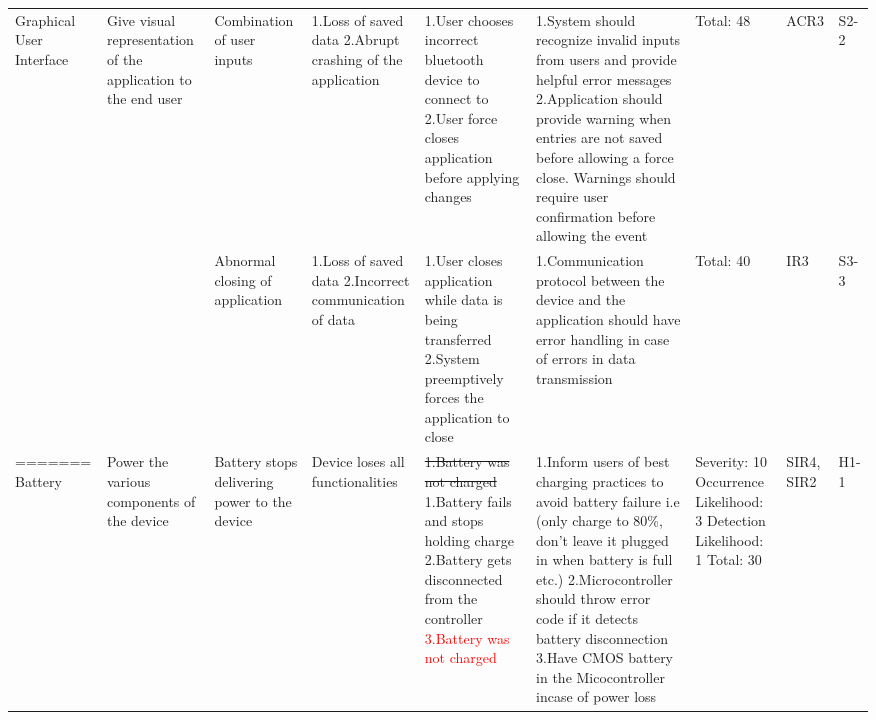 \documentclass[12pt, titlepage]{article}
\begin{document}
\begin{landscape}
\begin{table}[H]
\begin{tabular}{| p{} | p{}  | p{} | p{} | p{} | p{} | p{} | p{} | p{} |}
    Graphical User Interface & Give visual representation of the application to the end user & Combination of user inputs & 1.Loss of saved data \newline 2.Abrupt crashing of the application  &  1.User chooses incorrect bluetooth device to connect to \newline 2.User force closes application before applying changes  &  1.System should recognize invalid inputs from users and provide helpful error messages \newline 2.Application should provide warning when entries are not saved before allowing a force close. Warnings should require user confirmation before allowing the event  & Total: 48 & ACR3 & S2-2 \\ \cline{3-9}

     & & Abnormal closing of application & 1.Loss of saved data \newline 2.Incorrect communication of data  & 1.User closes application while data is being transferred \newline 2.System preemptively forces the application to close & 1.Communication protocol between the device and the application should have error handling in case of errors in data transmission  & Total: 40 & IR3 & S3-3 \\ \hline
=======
    Battery & Power the various components of the device  & Battery stops delivering power to the device & Device loses all functionalities & \sout{1.Battery was not charged} \newline 1.Battery fails and stops holding charge \newline 2.Battery gets disconnected from the controller \newline \textcolor{red}{3.Battery was not charged} & 1.Inform users of best charging practices to avoid battery failure i.e (only charge to 80\%, don't leave it plugged in when battery is full etc.) \newline 2.Microcontroller should throw error code if it detects battery disconnection \newline 3.Have CMOS battery in the Micocontroller incase of power loss & Severity: 10 \newline Occurrence Likelihood: 3 \newline Detection Likelihood: 1 \newline Total: 30 & SIR4, SIR2 & H1-1 \\ \cline{1-9}
    
    \end{tabular}


\end{table}
\end{landscape}
\end{document}
